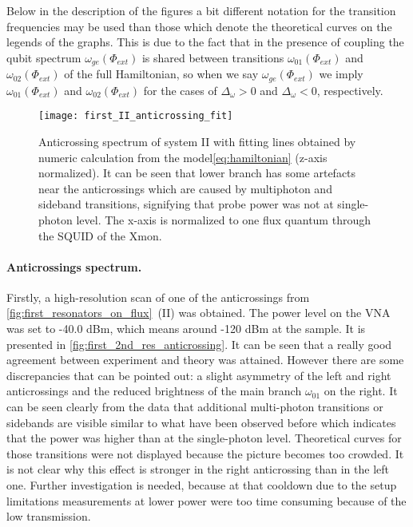 \documentclass[12pt, twoside]{report}
\numberwithin{equation}{section}
\begin{document}
Below in the description of the figures a bit different notation for the transition frequencies may be used than those which denote the theoretical curves on the legends of the graphs. This is due to the fact that in the presence of coupling the qubit spectrum $\omega_{ge}(\Phi_{ext})$ is shared between transitions $\omega_{01}(\Phi_{ext})$ and $\omega_{02}(\Phi_{ext})$ of the full Hamiltonian, so when we say $\omega_{ge}(\Phi_{ext})$ we imply $\omega_{01}(\Phi_{ext})$ and $\omega_{02}(\Phi_{ext})$ for the cases of $\Delta_\omega > 0 $ and $\Delta_\omega < 0$, respectively.

\begin{figure}
\centering
\texttt{[image: first\_II\_anticrossing\_fit]}
\caption{Anticrossing spectrum of system II with fitting lines obtained by numeric calculation from the model\eqref{eq:hamiltonian} (z-axis normalized). It can be seen that lower branch has some artefacts near the anticrossings which are caused by multiphoton and sideband transitions, signifying that probe power was not at single-photon level. The x-axis is normalized to one flux quantum through the SQUID of the Xmon.}
\label{fig:first_2nd_res_anticrossing}
\end{figure} 

\paragraph{Anticrossings spectrum.} Firstly, a high-resolution scan of one of the anticrossings from \autoref{fig:first_resonators_on_flux}~(II) was obtained. The power level on the VNA was set to -40.0 dBm, which means around -120 dBm at the sample. It is presented in \autoref{fig:first_2nd_res_anticrossing}. It can be seen that a really good agreement between experiment and theory was attained. However there are some discrepancies that can be pointed out: a slight asymmetry of the left and right anticrossings and the reduced brightness of the main branch $\omega_{01}$ on the right. It can be seen clearly from the data that additional multi-photon transitions or sidebands are visible similar to what have been observed before\cite{bishop2009} which indicates that the power was higher than at the single-photon level. Theoretical curves for those transitions were not displayed because the picture becomes too crowded. It is not clear why this effect is stronger in the right anticrossing than in the left one. Further investigation is needed, because at that cooldown due to the setup limitations measurements at lower power were too time consuming because of the low transmission.
\end{document}
